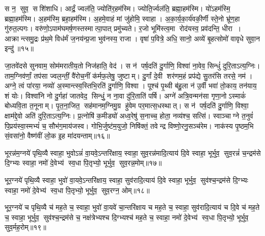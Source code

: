 स न॒ सुव॒ सशि॑शाधि। 
आर्द्रं॒ ज्वल॑ति॒ ज्योति॑र॒हम॑स्मि। 
ज्योति॒र्ज्वल॑ति॒ ब्रह्मा॒हम॑स्मि। 
यो॑ऽहम॑स्मि॒ ब्रह्मा॒हम॑स्मि। 
अ॒हम॑स्मि॒ ब्रहा॒हम॑स्मि। 
अ॒हमे॒वाहं मां जु॑होमि॒ स्वाहा। 
अ॒का॒र्य॒का॒र्य॑वकी॒र्णी स्ते॒नो भ्रू॑ण॒हा गु॑रुत॒ल्पगः। 
वरु॑णो॒ऽपाम॑घ\-मर्\mbox{}ष॒णस्तस्मात्पा॒पात् प्रमु॑च्यते। 
र॒जो भूमि॑स्त्व॒मा रोद॑यस्व॒ प्रव॑दन्ति॒ धीरा। 
आक्रान्त्समु॒द्रः प्र॑थ॒मे विध॑र्मं ज॒नय॑न्प्र॒जा भुव॑नस्य॒ राजा। 
वृषा॑ प॒वित्रे॒ अधि॒ सानो॒ अव्ये॑ बृ॒हत्सोमो॑ वावृधे सुवा॒न इन्दु॑॥१५॥
\anuvakamend

 जा॒तवे॑दसे सुनवाम॒ सोम॑मरातीय॒तो निज॑हाति॒ वेद॑। 
 स न॑ पर्\mbox{}ष॒दति॑ दु॒र्गाणि॒ विश्वा॑ ना॒वेव॒ सिन्धुं॑ दुरि॒ताऽत्य॒ग्निः। 
 ताम॒ग्निव॑र्णां॒ तप॑सा ज्वल॒न्तीं॒ वै॑रोच॒नीं क॑र्मफ॒लेषु॒ जुष्टाम्। 
 दु॒र्गां दे॒वी शर॑णम॒हं प्रप॑द्ये सु॒तर॑सि तरसे॒ नम॑। 
 अग्ने॒ त्वं पा॑रया॒ नव्यो॑ अ॒स्मान्त्स्व॒स्तिभि॒रति॑ दु॒र्गाणि॒ विश्वा। 
 पूश्च॑ पृ॒थ्वी ब॑हु॒ला न॑ उ॒र्वी भवा॑ तो॒काय॒ तन॑याय॒ शं योः। 
 विश्वा॑नि नो दु॒र्गहा॑ जातवेद॒ सिन्धुं॒ न ना॒वा दु॑रि॒ताति॑ पर्\mbox{}षि। 
 अग्ने॑ अत्रि॒वन्मन॑सा गृणा॒नोऽस्माकं॑ बोध्यवि॒ता त॒नूनाम्। 
 पृ॒त॒ना॒जित॒ सह॑मानम॒ग्निमु॒ग्र हु॑वेम पर॒मात्स॒धस्थात्। 
 स न॑ पर्\mbox{}ष॒दति॑ दु॒र्गाणि॒ विश्वा॒ क्षाम॑द्दे॒वो अति॑ दुरि॒ताऽत्य॒ग्निः। 
 प्र॒त्नोषि॑ क॒मीड्यो॑ अध्व॒रेषु॑ स॒नाच्च॒ होता॒ नव्य॑श्च॒ सत्सि॑। 
 स्वाञ्चाग्ने त॒नुवं॑ पि॒प्रय॑स्वा॒स्मभ्यं॑ च॒ सौभ॑ग॒माय॑जस्व। 
 गोभि॒र्जुष्ट॑म॒युजो॒ निषि॑क्तं॒ तवेन्द्र विष्णो॒रनु॒सञ्च॑रेम। 
 नाक॑स्य पृ॒ष्ठम॒भि सं॒वसा॑नो॒ वैष्ण॑वीं लो॒क इ॒ह मा॑दयन्ताम्॥१६॥
\anuvakamend%


भूरन्न॑म॒ग्नये॑ पृथि॒व्यै स्वाहा॒ भुवोऽन्नं॑ वा॒यवे॒ऽन्तरि॑क्षाय॒ स्वाहा॒ सुव॒रन्न॑मादि॒त्याय॑ दि॒वे स्वाहा॒ भूर्भुव॒ सुव॒रन्नं॑ च॒न्द्रम॑से दि॒ग्भ्यः स्वाहा॒ नमो॑ दे॒वेभ्य॑ स्व॒धा पि॒तृभ्यो॒ भूर्भुव॒ सुव॒रन्न॒मोम्॥१७॥
\anuvakamend

भूर॒ग्नये॑ पृथि॒व्यै स्वाहा॒ भुवो॑ वा॒यवे॒ऽन्तरि॑क्षाय॒ स्वाहा॒ सुव॑रादि॒त्याय॑ दि॒वे स्वाहा॒ भूर्भुव॒ सुव॑श्च॒न्द्रम॑से दि॒ग्भ्यः स्वाहा॒ नमो॑ दे॒वेभ्य॑ स्व॒धा पि॒तृभ्यो॒ भूर्भुव॒ सुव॒रग्न॒ ओम्॥१८॥
\anuvakamend

भूर॒ग्नये॑ च पृथि॒व्यै च॑ मह॒ते च॒ स्वाहा॒ भुवो॑ वा॒यवे॑ चा॒न्तरि॑क्षाय च मह॒ते च॒ स्वाहा॒ सुव॑रादि॒त्याय॑ च दि॒वे च॑ मह॒ते च॒ स्वाहा॒ भूर्भुव॒ सुव॑श्च॒न्द्रम॑से च॒ नक्ष॑त्रेभ्यश्च दि॒ग्भ्यश्च॑ मह॒ते च॒ स्वाहा॒ नमो॑ दे॒वेभ्य॑ स्व॒धा पि॒तृभ्यो॒ भूर्भुव॒ सुव॒र्मह॒रोम्॥१९॥ 
\anuvakamend

